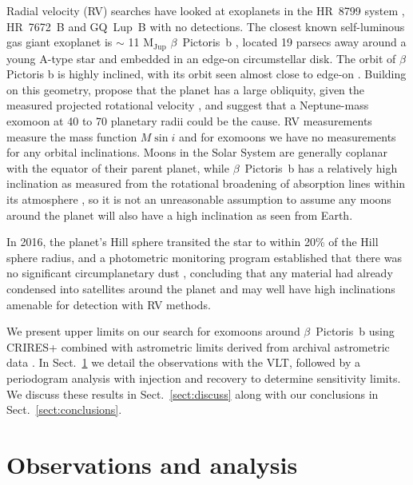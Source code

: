 \documentclass[fleqn,usenatbib]{mnras}
\newcommand{\kms}{km s$^{-1}$}
\newcommand{\bpb}{$\beta$~Pictoris~b}
\newcommand{\mj}{$\mathrm{M_{Jup}}$}
\begin{document}
Radial velocity (RV) searches have looked at exoplanets in the HR~8799 system \citep{Vanderburg21}, HR~7672~B \citep{Ruffio23} and GQ~Lup~B \citep{Horstman24} with no detections.
%
The closest known self-luminous gas giant exoplanet is $\sim$ 11 \mj{} \bpb{} \citep{Lagrange09-1,Lacour21}, located 19 parsecs away around a young \citep[23 Myr; ][]{Bell15} A-type star and embedded in an edge-on circumstellar disk.
%
The orbit of $\beta$ Pictoris b is highly inclined, with its orbit seen almost close to edge-on \citep{Lacour21}.
%
Building on this geometry, \citet{Poon24} propose that the planet has a large obliquity, given the measured projected rotational velocity \citep[$v \sin i = 20$ \kms{};][]{Landman24b}, and suggest that a Neptune-mass exomoon at 40 to 70 planetary radii could be the cause.
%
RV measurements measure the mass function $M\sin i$ and for exomoons we have no measurements for any orbital inclinations.
%
Moons in the Solar System are generally coplanar with the equator of their parent planet, while \bpb{} has a relatively high inclination as measured from the rotational broadening of absorption lines within its atmosphere \citep{Snellen14}, so it is not an unreasonable assumption to assume any moons around the planet will also have a high inclination as seen from Earth.

In 2016, the planet's Hill sphere transited the star to within 20\% of the Hill sphere radius, and a photometric monitoring program established that there was no significant circumplanetary dust \citep{Kenworthy21}, concluding that any material had already condensed into satellites around the planet and may well have high inclinations amenable for detection with RV methods.

We present upper limits on our search for exomoons around \bpb{} using CRIRES+ combined with astrometric limits derived from archival astrometric data \citep{Macias26}.
%
In Sect.~\ref{sect:obs} we detail the observations with the VLT, followed by a periodogram analysis with injection and recovery to determine sensitivity limits.
%
We discuss these results in Sect.~\ref{sect:discuss} along with our conclusions in Sect.~\ref{sect:conclusions}.


\section{Observations and analysis}\label{sect:obs}
\end{document}
